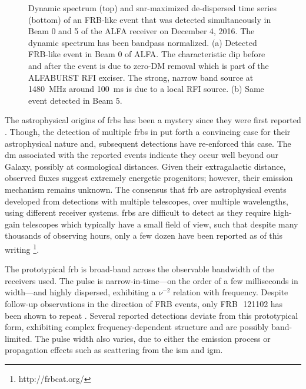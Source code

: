 \documentclass[a4paper,fleqn,usenatbib]{mnras}
\begin{document}
\begin{figure}
\begin{subfigure}[t]{0.45\textwidth}
        \caption{}
        \label{fig:beam5_dynamic_spec}
    \end{subfigure}
    \caption{
    Dynamic spectrum (top) and \gls{snr}-maximized de-dispersed time series
    (bottom) of an FRB-like event that was detected simultaneously in Beam 0 and
    5 of the ALFA receiver on December 4, 2016. The dynamic spectrum has been
    bandpass normalized. (a) Detected FRB-like event in Beam 0 of ALFA. The
    characteristic dip before and after the event is due to zero-DM removal
    which is part of the ALFABURST RFI exciser. The strong, narrow band source
    at 1480~MHz around 100~ms is due to a local RFI source. (b) Same event
    detected in Beam 5.
    }
    \label{fig:dynamic_spec}
\end{figure}

The astrophysical origins of \glspl{frb} has been a mystery since they were
first reported \citep{2007Sci...318..777L}.  Though, the detection of multiple
\glspl{frb} in \cite{2013Sci...341...53T} put forth a convincing case for their
astrophysical nature and, subsequent detections have re-enforced this case.  The
\gls{dm} associated with the reported events indicate they occur well beyond our
Galaxy, possibly at cosmological distances.  Given their extragalactic distance,
observed fluxes suggest extremely energetic progenitors; however, their emission
mechanism remains unknown.  The consensus that \gls{frb} are astrophysical
events developed from  detections with multiple telescopes, over multiple
wavelengths, using different receiver systems.  \glspl{frb} are difficult to
detect as they require high-gain telescopes which typically have a small field
of view, such that despite many thousands of observing hours, only a few dozen
have been reported as of this writing
\citep{2016PASA...33...45P}\footnote{http://frbcat.org/}.

The prototypical \gls{frb} is broad-band across the observable bandwidth of the
receivers used. The pulse is narrow-in-time---on the order of a few milliseconds
in width---and highly dispersed, exhibiting a $\nu^{-2}$ relation with
frequency.  Despite follow-up observations in the direction of FRB events, only
FRB\,~121102 has been shown to repeat \citep{2016Natur.531..202S}. Several
reported detections deviate from this prototypical form, exhibiting complex
frequency-dependent structure and are possibly band-limited. The pulse width
also varies, due to either the emission process or propagation effects such as
scattering from the \gls{ism} and \gls{igm}.
\end{document}
